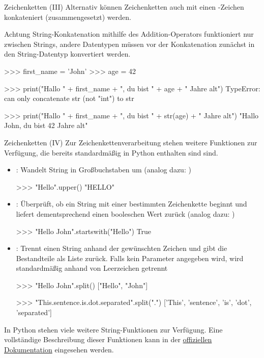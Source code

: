         \begin{frame}[fragile]{Zeichenketten (III)}
        Alternativ können Zeichenketten auch mit einen \code{+}-Zeichen konkateniert (zusammengesetzt) werden.
        
        \begin{alertblock}{Achtung}
                String-Konkatenation mithilfe des Addition-Operators funktioniert nur zwischen Strings, andere Datentypen müssen vor der Konkatenation zunächst in den String-Datentyp konvertiert werden.
            \end{alertblock}
\begin{pythoncode}
>>> first_name = 'John'
>>> age = 42

>>> print("Hallo " + first_name + ", du bist " + age +  " Jahre alt")
TypeError: can only concatenate str (not "int") to str

>>> print("Hallo " + first_name + ", du bist " + str(age) +  " Jahre alt")
"Hallo John, du bist 42 Jahre alt"
        \end{pythoncode}       
            
        
        \end{frame}
        
        \begin{frame}{Zeichenketten (IV)}
            Zur Zeichenkettenverarbeitung stehen weitere Funktionen zur Verfügung, die bereits standardmäßig in Python enthalten sind sind.
            
            \begin{itemize}
                \item {}: Wandelt String in Großbuchstaben um (analog dazu: )
\begin{pythoncode}
>>> "Hello".upper()
"HELLO"
\end{pythoncode}
                \item {}: Überprüft, ob ein String mit einer bestimmten Zeichenkette beginnt und liefert dementsprechend einen booleschen Wert zurück (analog dazu: )
\begin{pythoncode}
>>> "Hello John".startswith("Hello")
True
\end{pythoncode}

                \item {}: Trennt einen String anhand der gewünschten Zeichen und gibt die Bestandteile als Liste zurück. Falls kein Parameter angegeben wird, wird standardmäßig anhand von Leerzeichen getrennt
\begin{pythoncode}
>>> "Hello John".split()
["Hello", "John"]

>>> "This.sentence.is.dot.separated".split(".")
['This', 'sentence', 'is', 'dot', 'separated']
\end{pythoncode}
            \end{itemize}
            
In Python stehen viele weitere String-Funktionen zur Verfügung. Eine vollständige Beschreibung dieser Funktionen kann in der \href{https://docs.python.org/3/library/stdtypes.html#string-methods}{offiziellen Dokumentation} eingesehen werden.
        \end{frame}
        
